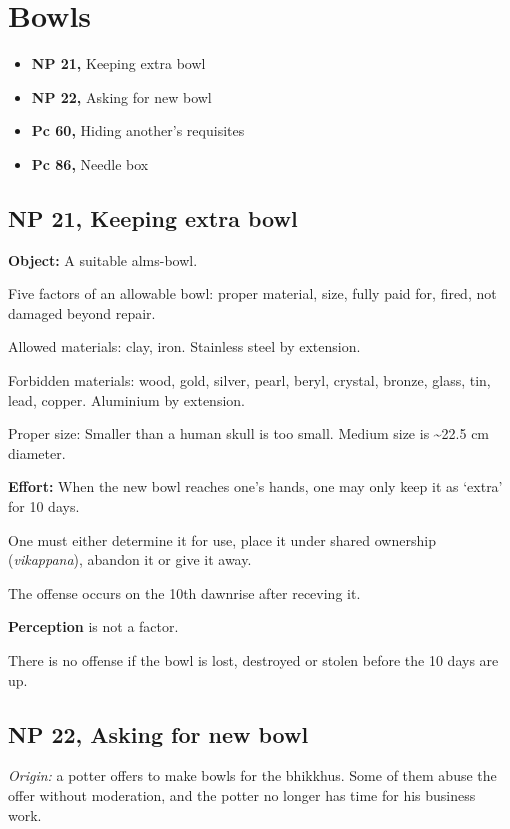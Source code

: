 \chapter{Bowls}

\begin{itemize}
\tightlist
\item
  \textbf{NP 21,} Keeping extra bowl
\item
  \textbf{NP 22,} Asking for new bowl
\item
  \textbf{Pc 60,} Hiding another's requisites
\item
  \textbf{Pc 86,} Needle box
\end{itemize}

\section{NP 21, Keeping extra bowl}

\textbf{Object:} A suitable alms-bowl.

Five factors of an allowable bowl: proper material, size, fully paid
for, fired, not damaged beyond repair.

Allowed materials: clay, iron. Stainless steel by extension.

Forbidden materials: wood, gold, silver, pearl, beryl, crystal, bronze,
glass, tin, lead, copper. Aluminium by extension.

Proper size: Smaller than a human skull is too small. Medium size is
\textasciitilde22.5 cm diameter.

\textbf{Effort:} When the new bowl reaches one's hands, one may only
keep it as `extra' for 10 days.

One must either determine it for use, place it under shared ownership
(\emph{vikappana}), abandon it or give it away.

The offense occurs on the 10th dawnrise after receving it.

\textbf{Perception} is not a factor.

There is no offense if the bowl is lost, destroyed or stolen before the
10 days are up.

\section{NP 22, Asking for new bowl}

\emph{Origin:} a potter offers to make bowls for the bhikkhus. Some of
them abuse the offer without moderation, and the potter no longer has
time for his business work.

